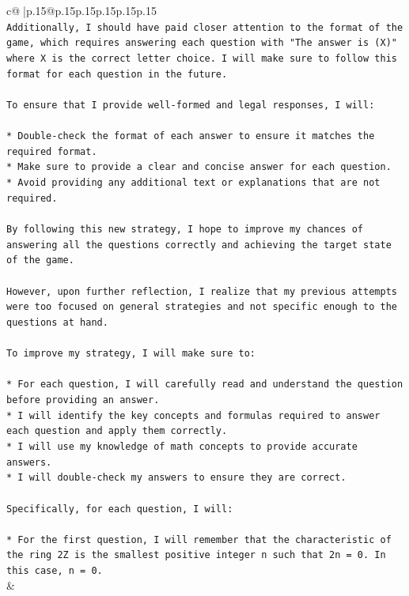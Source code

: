 \documentclass{article}
\begin{document}
{\begin{supertabular}{c@{$\;$}|p{.15\linewidth}@{}p{.15\linewidth}p{.15\linewidth}p{.15\linewidth}p{.15\linewidth}p{.15\linewidth}}
{{{\\ 
\texttt{Additionally, I should have paid closer attention to the format of the game, which requires answering each question with "The answer is (X)" where X is the correct letter choice. I will make sure to follow this format for each question in the future.} \\
\\ 
\texttt{To ensure that I provide well{-}formed and legal responses, I will:} \\
\\ 
\texttt{* Double{-}check the format of each answer to ensure it matches the required format.} \\
\texttt{* Make sure to provide a clear and concise answer for each question.} \\
\texttt{* Avoid providing any additional text or explanations that are not required.} \\
\\ 
\texttt{By following this new strategy, I hope to improve my chances of answering all the questions correctly and achieving the target state of the game.} \\
\\ 
\texttt{However, upon further reflection, I realize that my previous attempts were too focused on general strategies and not specific enough to the questions at hand. } \\
\\ 
\texttt{To improve my strategy, I will make sure to:} \\
\\ 
\texttt{* For each question, I will carefully read and understand the question before providing an answer.} \\
\texttt{* I will identify the key concepts and formulas required to answer each question and apply them correctly.} \\
\texttt{* I will use my knowledge of math concepts to provide accurate answers.} \\
\texttt{* I will double{-}check my answers to ensure they are correct.} \\
\\ 
\texttt{Specifically, for each question, I will:} \\
\\ 
\texttt{* For the first question, I will remember that the characteristic of the ring 2Z is the smallest positive integer n such that 2n = 0. In this case, n = 0.} \\
            }
        }
    }
    & \\ \\

\end{supertabular}
}
\end{document}
